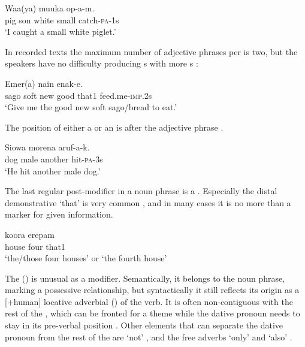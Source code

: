 \ea%
\label{ex:4:x419}
\gll Waa(ya)  muuka     op-a-m. \\
  pig  son  white  small  catch-\textsc{pa}-1s    \\
\glt`I caught  a small white piglet.'
\z

In recorded texts the maximum number of adjective phrases per  is two, but the speakers have no difficulty producing s with more s :

\ea%
\label{ex:4:x420}
\gll Emer(a)      nain  enak-e. \\
  sago  soft  new  good  that1  feed.me-\textsc{imp}.2s    \\
\glt`Give me the good new soft sago/bread to eat.'
\z

The position of either a  or an  is after the adjective phrase .

\ea%
\label{ex:4:x804}
\gll Siowa  morena    aruf-a-k. \\
  dog  male  another  hit-\textsc{pa}-3s    \\
\glt`He hit another male dog.'
\z

The last regular post-modifier in a noun phrase is a . Especially the distal demonstrative  `that' is very common , and in many cases it is no more than a marker for given information.

\ea%
\label{ex:4:x805}
\gll koora  erepam   \\
 house  four  that1     \\
\glt`the/those four houses' or `the fourth house'
\z

The  () is unusual as a modifier. Semantically, it belongs to the noun phrase, marking a possessive relationship, but syntactically it still reflects its origin as a [+human] locative adverbial () of the verb. It is often non-contiguous with the rest of the , which can be fronted for a theme  while the dative pronoun needs to stay in its pre-verbal position . Other elements that can separate the dative pronoun from the rest of the  are  `not' , and the free adverbs  `only' and  `also' . 

